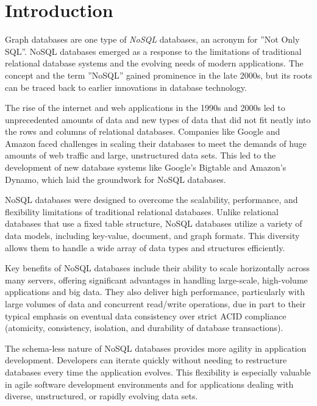 %
%

\section{Introduction}

Graph databases are one type of \emph{NoSQL} databases, an acronym for ''Not Only SQL''. NoSQL databases emerged as a response to the limitations of traditional relational database systems and the evolving needs of modern applications. The concept and the term ''NoSQL'' gained prominence in the late 2000s, but its roots can be traced back to earlier innovations in database technology.

The rise of the internet and web applications in the 1990s and 2000s led to unprecedented amounts of data and new types of data that did not fit neatly into the rows and columns of relational databases. Companies like Google and Amazon faced challenges in scaling their databases to meet the demands of huge amounts of web traffic and large, unstructured data sets. This led to the development of new database systems like Google's Bigtable and Amazon's Dynamo, which laid the groundwork for NoSQL databases.

NoSQL databases were designed to overcome the scalability, performance, and flexibility limitations of traditional relational databases. Unlike relational databases that use a fixed table structure, NoSQL databases utilize a variety of data models, including key-value, document, and graph formats. This diversity allows them to handle a wide array of data types and structures efficiently.

Key benefits of NoSQL databases include their ability to scale horizontally across many servers, offering significant advantages in handling large-scale, high-volume applications and big data. They also deliver high performance, particularly with large volumes of data and concurrent read/write operations, due in part to their typical emphasis on eventual data consistency over strict ACID compliance (atomicity, consistency, isolation, and durability of database transactions).

The schema-less nature of NoSQL databases provides more agility in application development. Developers can iterate quickly without needing to restructure databases every time the application evolves. This flexibility is especially valuable in agile software development environments and for applications dealing with diverse, unstructured, or rapidly evolving data sets.

